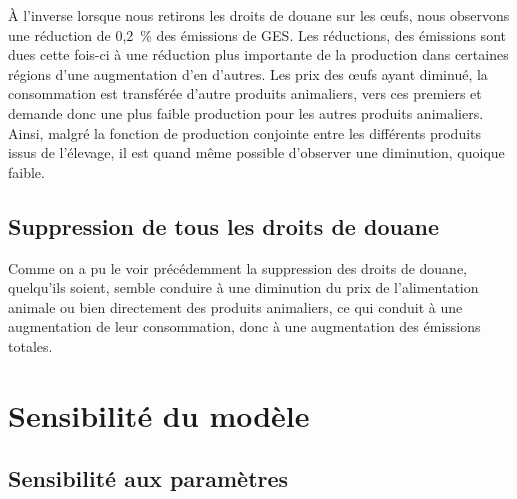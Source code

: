 À l'inverse lorsque nous retirons les droits de douane sur les œufs, nous observons une réduction de 0,2~\% des émissions de GES. Les réductions, des émissions sont dues cette fois-ci à une réduction plus importante de la production dans certaines régions d'une augmentation d'en d'autres. Les prix des œufs ayant diminué, la consommation est transférée d'autre produits animaliers, vers ces premiers et demande donc une plus faible production pour les autres produits animaliers. Ainsi, malgré la fonction de production conjointe entre les différents produits issus de l'élevage, il est quand même possible d'observer une diminution, quoique faible.


\subsection{Suppression de tous les droits de douane}

Comme on a pu le voir précédemment la suppression des droits de douane, quelqu'ils soient, semble conduire à une diminution du prix de l'alimentation animale ou bien directement des produits animaliers, ce qui conduit à une augmentation de leur consommation, donc à une augmentation des émissions totales.


\section{Sensibilité du modèle}

\subsection{Sensibilité aux paramètres}

